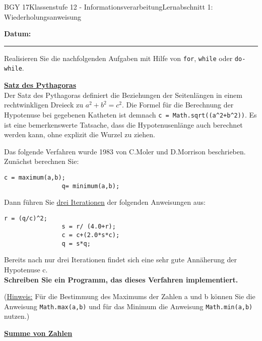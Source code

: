 \documentclass[oneside,openany,headings=optiontotoc,11pt,numbers=noenddot]{scrreprt}
\begin{document}
	\begin{worksheet}{BGY 17}{Klassenstufe 12 - Informationsverarbeitung}{Lernabschnitt 1: Wiederholungsanweisung}
				
		\noindent
		\sffamily
		\textbf{Datum:}
		\rule{0.91\textwidth}{0.4pt}
		\begin{framed}
			\noindent
			Realisieren Sie die nachfolgenden Aufgaben mit Hilfe von \lstinline[style=JavaInputStyle]{for}, \lstinline[style=JavaInputStyle]{while} oder \lstinline[style=JavaInputStyle]{do-while}.\\
			\par\noindent
			\textbf{\underline{Satz des Pythagoras}}\\
			Der Satz des Pythagoras definiert die Beziehungen der Seitenlängen in einem rechtwinkligen Dreieck zu \(a^2 + b^2 = c^2\). Die Formel für die Berechnung der Hypotenuse bei gegebenen Katheten ist demnach \lstinline[style=JavaInputStyle]{c = Math.sqrt((a^2+b^2))}. Es ist eine bemerkenswerte Tatsache, dass die Hypotenusenlänge auch berechnet werden kann, ohne explizit die Wurzel zu ziehen.\\
			\par\noindent
			Das folgende Verfahren wurde 1983 von C.Moler und D.Morrison beschrieben.\\Zunächst berechnen Sie:
			\begin{lstlisting}[style=JavaInputStyle]
				c = maximum(a,b);
				q= minimum(a,b);
			\end{lstlisting}
			Dann führen Sie \underline{drei Iterationen} der folgenden Anweisungen aus:
			\begin{lstlisting}[style=JavaInputStyle]
				r = (q/c)^2;
				s = r/ (4.0+r);
				c = c+(2.0*s*c);
				q = s*q;
			\end{lstlisting}
			\par\noindent
			Bereits nach nur drei Iterationen findet sich eine sehr gute Annäherung der Hypotenuse c.\\
			\textbf{Schreiben Sie ein Programm, das dieses Verfahren implementiert.}\\
			\par\noindent
			(\underline{Hinweis:} Für die Bestimmung des Maximums der Zahlen a und b können Sie die Anweisung \lstinline[style=JavaInputStyle]{Math.max(a,b)} und für das Minimum die Anweisung \lstinline[style=JavaInputStyle]{Math.min(a,b)} nutzen.)\\
			\par\bigskip\noindent
			\textbf{\underline{Summe von Zahlen}}\\

\end{framed}
\end{worksheet}
\end{document}
